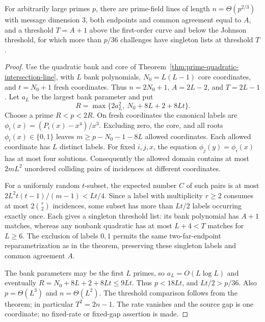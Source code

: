 \begin{corollary}
\label{cor:prime-positive-density}
For arbitrarily large primes $p$, there are prime-field lines of length
$n=\Theta(p^{2/3})$ with message dimension $3$, both endpoints and common
agreement equal to $A$, and a threshold $T=A+1$ above the first-order curve
and below the Johnson threshold, for which more than $p/36$ challenges
have singleton lists at threshold $T$.
\end{corollary}
\begin{proof}
Use the quadratic bank and core of Theorem~\ref{thm:prime-quadratic-intersection-line},
with $L$ bank polynomials, $N_0=L(L-1)$ core coordinates, and
$t=N_0+1$ fresh coordinates. Thus $n=2N_0+1$, $A=2L-2$, and $T=2L-1$.
Let $a_L$ be the largest bank parameter and put
\[
 R=\max\{2a_L^2,\ N_0+8L+2+8Lt\}.
\]
Choose a prime $R<p<2R$. On fresh coordinates the canonical labels are
$\phi_i(x)=(P_i(x)-x^4)/x^3$. Excluding zero, the core, and all roots
$\phi_i(x)\in\{0,1\}$ leaves $m\ge p-N_0-1-8L$ allowed coordinates.
Each allowed coordinate has $L$ distinct labels. For fixed $i,j,x$,
the equation $\phi_j(y)=\phi_i(x)$ has at most four solutions.
Consequently the allowed domain contains at most $2mL^2$ unordered
colliding pairs of incidences at different coordinates.

For a uniformly random $t$-subset, the expected number $C$ of such pairs
is at most $2L^2t(t-1)/(m-1)<Lt/4$. Since a label with multiplicity
$r\ge2$ consumes at most $2\binom r2$ incidences, some subset has more
than $Lt/2$ labels occurring exactly once. Each gives a singleton
threshold list: its bank polynomial has $A+1$ matches, whereas any
nonbank quadratic has at most $L+4<T$ matches for $L\ge6$.
The exclusion of labels $0,1$ permits the same two-far-endpoint
reparametrization as in the theorem, preserving these singleton labels
and common agreement $A$.

The bank parameters may be the first $L$ primes, so
$a_L=O(L\log L)$ and eventually $R=N_0+8L+2+8Lt\le9Lt$.
Thus $p<18Lt$, and $Lt/2>p/36$. Also $p=\Theta(L^3)$ and
$n=\Theta(L^2)$. The threshold comparison follows from the theorem;
in particular $T^2=2n-1$. The rate vanishes and the source gap is one
coordinate; no fixed-rate or fixed-gap assertion is made.
\end{proof}
